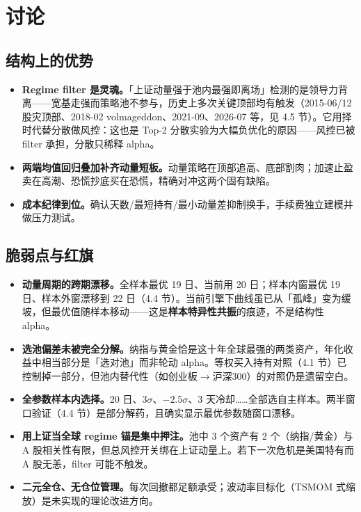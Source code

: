 \documentclass[11pt]{ctexart}
\begin{document}
\section{讨论}

\subsection{结构上的优势}

\begin{itemize}
  \item \textbf{Regime filter 是灵魂。}「上证动量强于池内最强即离场」检测的是领导力背离——宽基走强而策略池不参与，历史上多次关键顶部均有触发（2015-06/12 股灾顶部、2018-02 volmageddon、2021-09、2026-07 等，见 4.5 节）。它用择时代替分散做风控：这也是 Top-2 分散实验为大幅负优化的原因——风控已被 filter 承担，分散只稀释 alpha。
  \item \textbf{两端均值回归叠加补齐动量短板。}动量策略在顶部追高、底部割肉；加速止盈卖在高潮、恐慌抄底买在恐慌，精确对冲这两个固有缺陷。
  \item \textbf{成本纪律到位。}确认天数/最短持有/最小动量差抑制换手，手续费独立建模并做压力测试。
\end{itemize}

\subsection{脆弱点与红旗}\label{sec:fragile}

\begin{itemize}
  \item \textbf{动量周期的跨期漂移。}全样本最优 19 日、当前用 20 日；样本内窗最优 19 日、样本外窗漂移到 22 日（4.4 节）。当前引擎下曲线虽已从「孤峰」变为缓坡，但最优值随样本移动——这是\textbf{样本特异性共振}的痕迹，不是结构性 alpha。
  \item \textbf{选池偏差未被完全分解。}纳指与黄金恰是这十年全球最强的两类资产，年化收益中相当部分是「选对池」而非轮动 alpha。等权买入持有对照（4.1 节）已控制掉一部分，但池内替代性（如创业板$\rightarrow$沪深300）的对照仍是遗留空白。
  \item \textbf{全参数样本内选择。}20 日、$3\sigma$、$-2.5\sigma$、3 天冷却……全部选自主样本。两半窗口验证（4.4 节）是部分解药，且确实显示最优参数随窗口漂移。
  \item \textbf{用上证当全球 regime 锚是集中押注。}池中 3 个资产有 2 个（纳指/黄金）与 A 股相关性有限，但总风控开关绑在上证动量上。若下一次危机是美国特有而 A 股无恙，filter 可能不触发。
  \item \textbf{二元全仓、无仓位管理。}每次回撤都足额承受；波动率目标化（TSMOM 式缩放）是未实现的理论改进方向。
\end{itemize}
\end{document}
